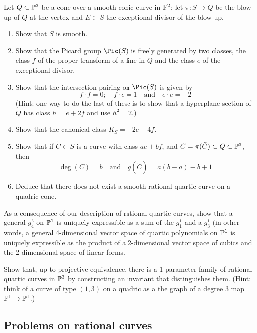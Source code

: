 \begin{exercise}\label{F2}
Let $Q \subset \PP^3$ be a cone over a smooth conic curve in $\PP^2$; let $\pi : S \to Q$ be the blow-up of $Q$ at the vertex and $E \subset S$ the exceptional divisor of the blow-up.
\begin{enumerate}
\item Show that $S$ is smooth.
\item Show that the Picard group $\Pic(S)$ is freely generated by two classes, the class $f$ of the proper transform of a line in $Q$ and the class $e$ of the exceptional divisor.
\item Show that the intersection pairing on $\Pic(S)$ is given by
$$
f \cdot f = 0; \quad f \cdot e = 1 \quad \text{and} \quad e \cdot e = -2
$$
(Hint: one way to do the last of these is to show that a hyperplane section of $Q$ has class $h = e + 2f$ and use $h^2 = 2$.)
\item Show that the canonical class $K_S = -2e-4f$.
\item Show that if $\tilde C \subset S$ is a curve with class $ae + bf$, and
$C = \pi(\tilde C) \subset Q \subset \PP^3$, then
$$
\deg(C) = b \quad \text{and} \quad g(\tilde C) = a(b-a) -b +1
$$
\item Deduce that there does not exist a smooth rational quartic curve on a quadric cone.
\end{enumerate}
\end{exercise}

\begin{exercise}
As a consequence of our description of rational quartic curves, show that a general $g^3_4$ on $\PP^1$ is uniquely expressible as a sum of the $g_1^1$ and a $g^1_3$
(in other words, a general 4-dimensional vector space of quartic polynomials on $\PP^1$ is uniquely expressible as the product of a 2-dimensional vector space of cubics and the 2-dimensional space of linear forms.
\end{exercise}

\begin{exercise}
Show that, up to projective equivalence, there is a 1-parameter family of rational quartic curves in $\PP^3$ 
by constructing an invariant that distinguishes them. (Hint: think of a curve of type $(1,3)$ on a quadric as a the graph of a degree 3 map $\PP^1 \to \PP^1$.)
\end{exercise}

\subsection{Problems on rational curves}

